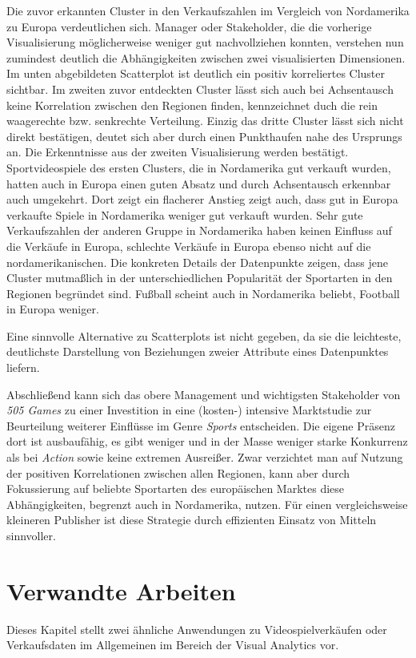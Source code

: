 \documentclass[usegeometry=true]{scrartcl}
\begin{document}
Die zuvor erkannten Cluster in den Verkaufszahlen im Vergleich von Nordamerika zu Europa verdeutlichen sich. 
Manager oder Stakeholder, die die vorherige Visualisierung möglicherweise weniger gut nachvollziehen konnten, verstehen nun zumindest deutlich die Abhängigkeiten zwischen zwei visualisierten Dimensionen. 
Im unten abgebildeten Scatterplot ist deutlich ein positiv korreliertes Cluster sichtbar. 
Im zweiten zuvor entdeckten Cluster lässt sich auch bei Achsentausch keine Korrelation zwischen den Regionen finden, kennzeichnet duch die rein waagerechte bzw. senkrechte Verteilung.
Einzig das dritte Cluster lässt sich nicht direkt bestätigen, deutet sich aber durch einen Punkthaufen nahe des Ursprungs an.
Die Erkenntnisse aus der zweiten Visualisierung werden bestätigt. 
Sportvideospiele des ersten Clusters, die in Nordamerika gut verkauft wurden, hatten auch in Europa einen guten Absatz und durch Achsentausch erkennbar auch umgekehrt.
Dort zeigt ein flacherer Anstieg zeigt auch, dass gut in Europa verkaufte Spiele in Nordamerika weniger gut verkauft wurden. 
Sehr gute Verkaufszahlen der anderen Gruppe in Nordamerika haben keinen Einfluss auf die Verkäufe in Europa, schlechte Verkäufe in Europa ebenso nicht auf die nordamerikanischen. 
Die konkreten Details der Datenpunkte zeigen, dass jene Cluster mutmaßlich in der unterschiedlichen Popularität der Sportarten in den Regionen begründet sind. 
Fußball scheint auch in Nordamerika beliebt, Football in Europa weniger.

Eine sinnvolle Alternative zu Scatterplots ist nicht gegeben, 
da sie die leichteste, deutlichste Darstellung von Beziehungen zweier Attribute eines Datenpunktes liefern. 

Abschließend kann sich das obere Management und wichtigsten Stakeholder von \textit{505 Games}
zu einer Investition in eine (kosten-) intensive Marktstudie zur Beurteilung weiterer Einflüsse im Genre \textit{Sports} entscheiden. 
Die eigene Präsenz dort ist ausbaufähig, es gibt weniger und in der Masse weniger starke Konkurrenz als bei \textit{Action} sowie keine extremen Ausreißer.
Zwar verzichtet man auf Nutzung der positiven Korrelationen zwischen allen Regionen, kann aber durch Fokussierung auf beliebte Sportarten des europäischen Marktes diese Abhängigkeiten, begrenzt auch in Nordamerika, nutzen.   
Für einen vergleichsweise kleineren Publisher ist diese Strategie durch effizienten Einsatz von Mitteln sinnvoller.
 
\section{Verwandte Arbeiten}
Dieses Kapitel stellt zwei ähnliche Anwendungen zu Videospielverkäufen oder Verkaufsdaten im Allgemeinen im Bereich der Visual Analytics vor. 
\end{document}
